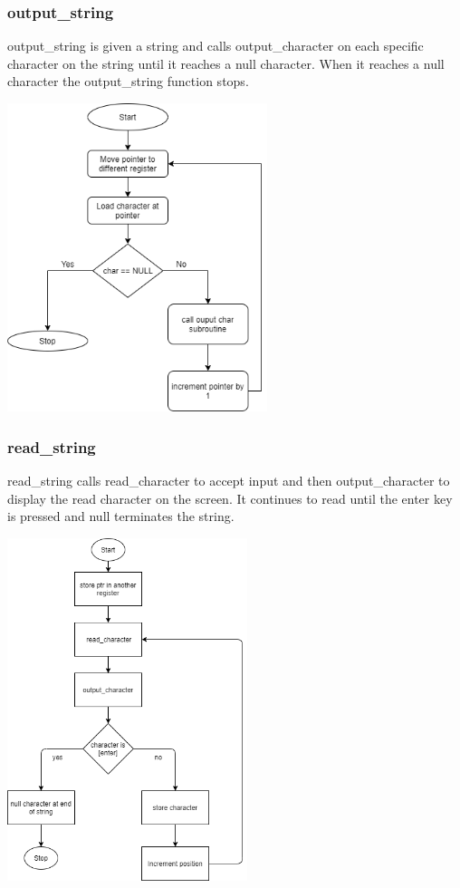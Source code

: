\documentclass{article}
\begin{document}
    \newpage
    \subsubsection{output\_string}
        output\_string is given a string and calls output\_character on each specific character on the string
        until it reaches a null character. When it reaches a null character the output\_string function stops.
        \begin{center}
            {\includegraphics[height=9cm]{output_string.png}\centering} 
        \end{center}


    \newpage
    \subsubsection{read\_string}
        read\_string calls read\_character to accept input and then output\_character
        to display the read character on the screen.  It continues to read until 
        the enter key is pressed and null terminates the string.
        \begin{center}
            {\includegraphics[height=10cm]{read_string.png}\centering} 
        \end{center}
    \newpage
\end{document}

